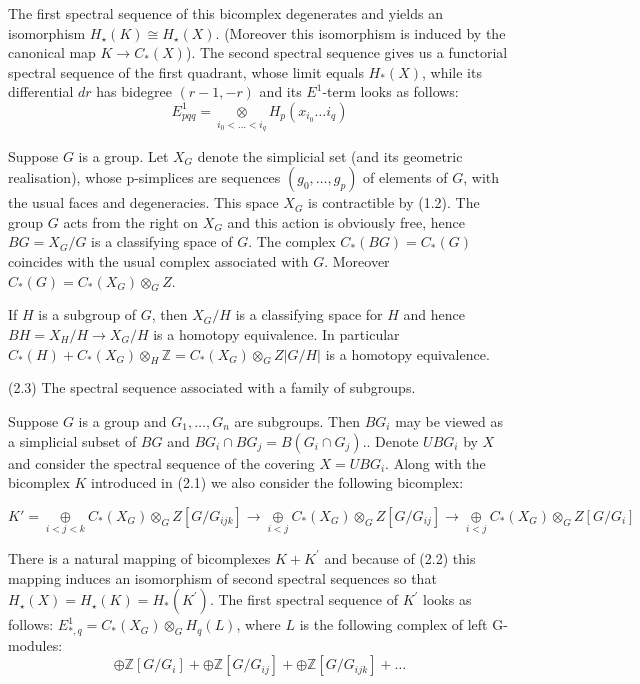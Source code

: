 \documentclass{book}
\begin{document}
The first spectral sequence of this bicomplex degenerates and yields an isomorphism $H_{\star}(K) \cong H_{\star}(X)$. (Moreover this isomorphism is induced by the canonical map $K \rightarrow C_*(X)$). The second spectral sequence gives us a functorial spectral sequence of the first quadrant, whose limit equals $H_*(X)$, while its differential $d r$ has bidegree $(r-1,-r)$ and its $E^1$-term looks as follows: $$E_{p q q}^1=\underset{i_0<\ldots<i_q}{\otimes} H_p\left(x_{i_0} \ldots i_q\right)$$

Suppose $G$ is a group. Let $X_G$ denote the simplicial set (and its geometric realisation), whose p-simplices are sequences $\left(g_0, \ldots, g_p\right)$ of elements of $G$, with the usual faces and degeneracies. This space $X_G$ is contractible by (1.2). The group $G$ acts from the right on $X_G$ and this action is obviously free, hence $B G=X_G / G$ is a classifying space of $G$. The complex $C_*(B G)=C_*(G)$ coincides with the usual complex associated with $G$. Moreover $C_*(G)=C_*\left(X_G\right) \otimes_G Z$.

If $H$ is a subgroup of $G$, then $X_G / H$ is a classifying space for $H$ and hence $B H=X_H / H \rightarrow X_G / H$ is a homotopy equivalence. In particular $C_*(H)+C_*\left(X_G\right) \otimes_H \mathbb{Z}=C_*\left(X_G\right) \otimes_G Z|G / H|$ is a homotopy equivalence.

(2.3) The spectral sequence associated with a family of subgroups.

Suppose $G$ is a group and $G_1, \ldots, G_n$ are subgroups. Then $B G_i$ may be viewed as a simplicial subset of $B G$ and $B G_i \cap B G_j=B\left(G_i \cap G_j\right)$.. Denote $U B G_i$ by $X$ and consider the spectral sequence of the covering $X=U B G_i$. Along with the bicomplex $K$ introduced in (2.1) we also consider the following bicomplex:

$$K' = \underset{i<j<k}{\oplus} C_*\left(X_G\right) \otimes_G Z\left[G / G_{i j k}\right] \longrightarrow \underset{i<j}{\oplus} C_*\left(X_G\right) \otimes_G Z\left[G / G_{i j}\right] \longrightarrow \underset{i<j}{\oplus} C_*\left(X_G\right) \otimes_G Z\left[G / G_{i}\right] $$

There is a natural mapping of bicomplexes $K+K^{\prime}$ and because of (2.2) this mapping induces an isomorphism of second spectral sequences so that $H_{\star}(X)=H_{\star}(K)=H_*\left(K^{\prime}\right)$. The first spectral sequence of $K^{\prime}$ looks as follows: $E_{*, q}^1=C_*\left(X_G\right) \otimes_G H_q(L)$, where $L$ is the following complex of left G-modules:
$$
\oplus \mathbb{Z}\left[G / G_i\right]+\oplus \mathbb{Z}\left[G / G_{i j}\right]+\oplus \mathbb{Z}\left[G / G_{i j k}\right]+\ldots
$$
\end{document}
